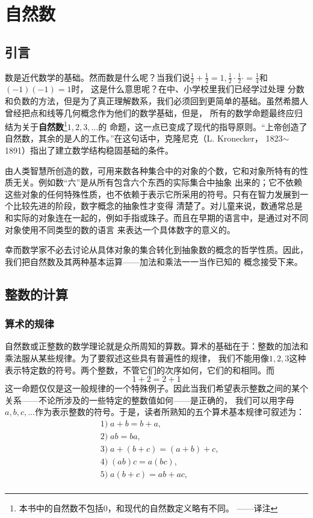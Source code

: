 \chapter{自然数}
\label{chap:natural-number}

\section*{引言}
数是近代数学的基础。然而数是什么呢？当我们说$\frac{1}{2} + \frac{1}{2}= 1,
\frac{1}{2} \cdot \frac{1}{2}· = \frac{1}{4}$和$(-1)(-1) = 1$时，
这是什么意思呢？在中、小学校里我们已经学过处理
分数和负数的方法，但是为了真正理解数系，我们必须回到更简单的基础。虽然希腊人曾经把点和线等几何概念作为他们的数学基础，但是，
所有的数学命题最终应归结为关于\textbf{自然数}\footnote{本书中的自然数不包括0，和现代的自然数定义略有不同。
——译注}$1,2,3,\ldots$的
命题，这一点已变成了现代的指导原则。“上帝创造了自然数，其余的是人的工作。”在这句话中，克隆尼克（L. Kronecker，
1823$\sim$1891）指出了建立数学结构稳固基础的条件。

由人类智慧所创造的数，可用来数各种集合中的对象的个数，它和对象所特有的性质无关。例如数“六”是从所有包含六个东西的实际集合中抽象
出来的；它不依赖这些对象的任何特殊性质，也不依赖于表示它所采用的符号。只有在智力发展到一个比较先进的阶段，数字概念的抽象性才变得
清楚了。对儿童来说，数通常总是和实际的对象连在一起的，例如手指或珠子。而且在早期的语言中，是通过对不同对象使用不同类型的数的语言
来表达一个具体数字的意义的。

幸而数学家不必去讨论从具体对象的集合转化到抽象数的概念的哲学性质。因此，我们把自然数及其两种基本运算——加法和乘法一一当作已知的
概念接受下来。

\newpage
\section{整数的计算}
\subsection{算术的规律}
自然数或正整数的数学理论就是众所周知的算数。算术的基础在于：整数的加法和乘法服从某些规律。为了要叙述这些具有普遍性的规律，
我们不能用像$1, 2, 3$这种表示特定数的符号。两个整数，不管它们的次序如何，它们的和相同。而
\begin{equation*}
1+2=2+1
\end{equation*}
这一命题仅仅是这一般规律的一个特殊例子。因此当我们希望表示整数之间的某个关系——不论所涉及的一些特定的整数值如何——是正确的，
我们可以用字母$a,b,c,\ldots$作为表示整数的符号。于是，读者所熟知的五个算术基本规律可叙述为：
\begin{equation*}
\begin{split}
&1)\; a+b=b+a,\\
&2)\; ab=ba,\\
&3)\; a+(b+c)=(a+b)+c,\\
&4)\; (ab)c = a(bc),\\
&5)\; a(b+c)=ab+ac,\\
\end{split}
\end{equation*}

